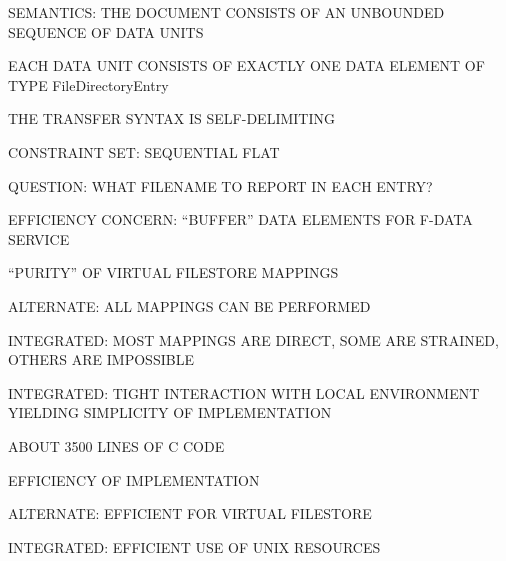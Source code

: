 \begin{bwslide}

\begin{nrtc}
\item	SEMANTICS: THE DOCUMENT CONSISTS OF AN UNBOUNDED SEQUENCE OF DATA UNITS
    \begin{nrtc}
    \item	EACH DATA UNIT CONSISTS OF EXACTLY ONE DATA ELEMENT OF
		TYPE FileDirectoryEntry

    \item	THE TRANSFER SYNTAX IS SELF-DELIMITING
    \end{nrtc}

\item	CONSTRAINT SET: SEQUENTIAL FLAT

\item	QUESTION: WHAT FILENAME TO REPORT IN EACH ENTRY?

\item	EFFICIENCY CONCERN: ``BUFFER'' DATA ELEMENTS FOR F-DATA SERVICE
\end{nrtc}
\end{bwslide}


\begin{bwslide}
\small

\begin{tgrind}
\let\linebox=\relax
\relax
\end{tgrind}
\end{bwslide}


\begin{bwslide}

\begin{nrtc}
\item	``PURITY'' OF VIRTUAL FILESTORE MAPPINGS
    \begin{nrtc}
    \item	ALTERNATE: ALL MAPPINGS CAN BE PERFORMED

    \item	INTEGRATED: MOST MAPPINGS ARE DIRECT, SOME ARE STRAINED, OTHERS
		ARE IMPOSSIBLE
    \end{nrtc}

\item	INTEGRATED: TIGHT INTERACTION WITH LOCAL ENVIRONMENT YIELDING
	SIMPLICITY OF IMPLEMENTATION
    \begin{nrtc}
    \item	ABOUT 3500 LINES OF C CODE
    \end{nrtc}

\item	EFFICIENCY OF IMPLEMENTATION
    \begin{nrtc}
    \item	ALTERNATE: EFFICIENT FOR VIRTUAL FILESTORE

    \item	INTEGRATED: EFFICIENT USE OF UNIX RESOURCES
    \end{nrtc}
\end{nrtc}
\end{bwslide}


